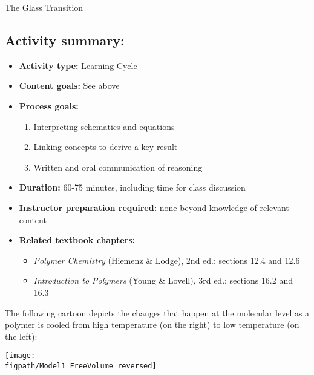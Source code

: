 \begin{activity}{The Glass Transition}
\begin{instructornotes}
	\subsection*{Activity summary:}
	\begin{itemize}
		\item \textbf{Activity type:} Learning Cycle
		\item \textbf{Content goals:} See above %
		\item \textbf{Process goals:} %
			\begin{enumerate}
				\item Interpreting schematics and equations
				\item Linking concepts to derive a key result
				\item Written and oral communication of reasoning
			\end{enumerate}
		\item \textbf{Duration:} 60-75 minutes, including time for class discussion
		\item \textbf{Instructor preparation required:} none beyond knowledge of relevant content
		\item \textbf{Related textbook chapters:}
			\begin{itemize}
				\item \emph{Polymer Chemistry} (Hiemenz \& Lodge), 2nd ed.: sections 12.4 and 12.6
				\item \emph{Introduction to Polymers} (Young \& Lovell), 3rd ed.: sections 16.2 and 16.3
			\end{itemize}
	\end{itemize}
	
\end{instructornotes}


\begin{model}
	\label{\labelbase:mdl:freevolume}
	
	The following cartoon depicts the changes that happen at the molecular level as a polymer is cooled from high temperature (on the right) to low temperature (on the left):
	
	\centerline{\texttt{[image: \\figpath/Model1\_FreeVolume\_reversed]}}
	

\end{model}
\end{activity}
